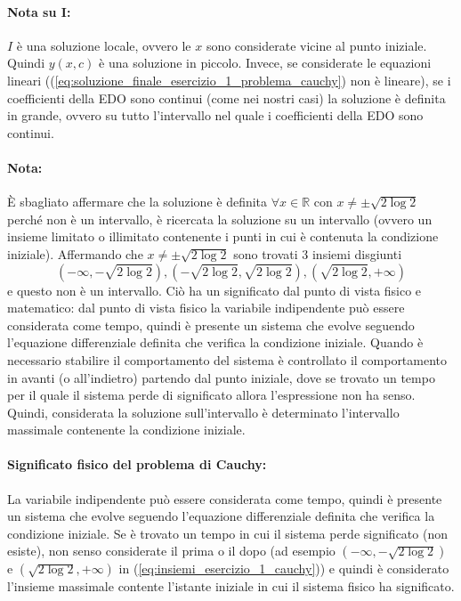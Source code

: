 \begin{example}
    \paragraph{Nota su $\boldsymbol I$:} $I$ è una soluzione locale, ovvero le $x$ sono considerate vicine al punto iniziale. Quindi $y(x,c)$ è una soluzione in piccolo. Invece, se considerate le equazioni lineari ((\ref{eq:soluzione_finale_esercizio_1_problema_cauchy}) non è lineare), se i coefficienti della EDO sono continui (come nei nostri casi) la soluzione è definita in grande, ovvero su tutto l'intervallo nel quale i coefficienti della EDO sono continui.
    
    \paragraph{Nota:}
    È sbagliato affermare che la soluzione è definita $\forall x\in\mathbb R$ con $x\neq \pm\sqrt{2\log2}$ perché non è un intervallo, è ricercata la soluzione su un intervallo (ovvero un insieme limitato o illimitato contenente i punti in cui è contenuta la condizione iniziale). Affermando che $x\neq\pm\sqrt{2\log2}$ sono trovati 3 insiemi disgiunti
    \begin{equation}\label{eq:insiemi_esercizio_1_cauchy}
        (-\infty, -\sqrt{2\log2}), (-\sqrt{2\log2}, \sqrt{2\log2}), (\sqrt{2\log2}, +\infty)
    \end{equation}
    e questo non è un intervallo. Ciò ha un significato dal punto di vista fisico e matematico: dal punto di vista fisico la variabile indipendente può essere considerata come tempo, quindi è presente un sistema che evolve seguendo l'equazione differenziale definita che verifica la condizione iniziale. Quando è necessario stabilire il comportamento del sistema è controllato il comportamento in avanti (o all'indietro) partendo dal punto iniziale, dove se trovato un tempo per il quale il sistema perde di significato allora l'espressione non ha senso.\\
    Quindi, considerata la soluzione sull'intervallo è determinato l'intervallo massimale contenente la condizione iniziale.\\
    \paragraph{Significato fisico del problema di Cauchy:} La variabile indipendente può essere considerata come tempo, quindi è presente un sistema che evolve seguendo l'equazione differenziale definita che verifica la condizione iniziale. Se è trovato un tempo in cui il sistema perde significato (non esiste), non senso considerate il prima o il dopo (ad esempio $(-\infty, -\sqrt{2\log2})$ e $ (\sqrt{2\log2}, +\infty)$ in (\ref{eq:insiemi_esercizio_1_cauchy})) e quindi è considerato l'insieme massimale contente l'istante iniziale in cui il sistema fisico ha significato.

\end{example}
